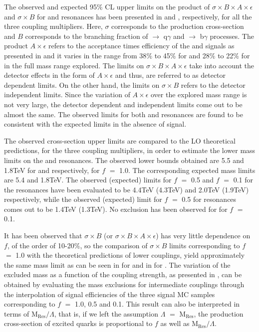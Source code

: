 The observed and expected 95$\%$ CL upper limits on the product of $\sigma\times{B}\times{A}\times\epsilon$ and $\sigma\times{B}$ for \qstar and \bstar
resonances has been presented in \fig{\ref{fig:qstarlimit}} and \fig{\ref{fig:bstarlimit}}, respectively, for all the three coupling multipliers. 
Here, $\sigma$ corresponds to the production cross-section and $B$ corresponds to the branching fraction
of \qstar $\rightarrow$ q$\gamma$ and \bstar $\rightarrow$ b$\gamma$
processes. The product $A\times\epsilon$ refers to the acceptance times efficiency of the \qstar and \bstar signals as presented in \fig{\ref{fig:accEff}} and it
varies in the range from 38$\%$ to 45$\%$ for \qstar and 28$\%$ to 22$\%$ for \bstar in the full mass range explored. The limits on $\sigma\times{B}\times{A}\times\epsilon$
take into account the detector effects in the form of $A\times\epsilon$ and thus, are referred to as detector dependent limits. On the other hand, the limits
on $\sigma\times{B}$ refers to the detector independent limits. Since the variation of $A\times\epsilon$ over the explored mass range is not very large, the
detector dependent and independent limits come out to be almost the same. The observed limits for both \qstar and \bstar resonances are found to be consistent with
the expected limits in the absence of signal.

The observed cross-section upper limits are compared to the LO theoretical predictions, for the three coupling
multipliers, in order to estimate the lower mass limits on the \qstar and \bstar resonances. The observed lower bounds obtained are 5.5 and 1.8\unit{TeV}
for \qstar and \bstar respectively, for $f$ $=$ 1.0. The corresponding expected mass limits are 5.4 and 1.8\unit{TeV}. The observed (expected) limits for $f$ $=$
0.5 and $f$ $=$ 0.1 for the \qstar resonances have been evaluated to be 4.4\unit{TeV} (4.3\unit{TeV}) and 2.0\unit{TeV} (1.9\unit{TeV}) respectively, while the
observed (expected) limit for $f$ $=$ 0.5 for \bstar resonances comes out to be 1.4\unit{TeV} (1.3\unit{TeV}). No exclusion has been observed for \bstar for $f$ $=$ 0.1.

It has been observed that $\sigma\times{B}$ (or $\sigma\times{B}\times{A}\times\epsilon$)
has very little dependence on $f$, of the order of 10-20$\%$, so the comparison of $\sigma\times{B}$ limits
corresponding to $f$ $=$ 1.0 with the theoretical predictions of lower couplings, yield approximately the same mass limit as can be seen in
\fig{\ref{fig:qstarlimit_allcoup}} for \qstar and in \fig{\ref{fig:bstarlimit_allcoup}} for \bstar. The variation of the excluded mass as a function of
the coupling strength, as presented in \fig{\ref{fig:2dcoup_all}}, can be obtained by evaluating the mass exclusions for intermediate couplings
through the interpolation of signal efficiencies of the three signal MC samples corresponding to $f$ $=$ 1.0, 0.5 and 0.1. This result can also be
interpreted in terms of M$_{\textrm{Res}}/\Lambda$, that is, if we left the assumption $\Lambda$ $=$ M$_{\textrm{Res}}$, the production cross-section
of excited quarks is proportional to $f$ as well as M$_{\textrm{Res}}/\Lambda$.

